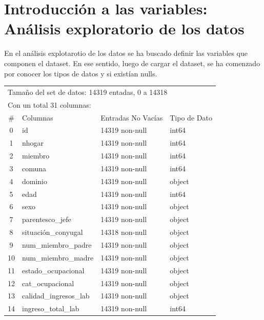 \documentclass[a4paper]{article}
\begin{document}
\newpage

\section{Introducción a las variables: Análisis exploratorio de los datos}
 
    En el análisis explotarotio de los datos se ha buscado definir las variables que componen el dataset. En ese sentido, luego de cargar el dataset, se ha comenzado por conocer los tipos de datos y si existían nulls.
   
    \begin{table}[H]\begin{center}
    \begin{tabular}{clll}
    \multicolumn{4}{l}{Tamaño del set de datos: 14319 entadas, 0 a 14318} \\
    \multicolumn{4}{l}{Con un total 31 columnas:}  \\
    \#  & Columnas                   & Entradas No Vacías & Tipo de Dato \\ \hline
    0  & id                          & 14319 non-null & int64 \\
    1  & nhogar                      & 14319 non-null & int64 \\
    2  & miembro                     & 14319 non-null & int64 \\
    3  & comuna                      & 14319 non-null & int64 \\
    4  & dominio                     & 14319 non-null & object \\
    5  & edad                        & 14319 non-null & int64 \\
    6  & sexo                        & 14319 non-null & object \\
    7  & parentesco\_jefe             & 14319 non-null & object \\
    8  & situación\_conyugal          & 14318 non-null & object \\
    9  & num\_miembro\_padre           & 14319 non-null & object \\
    10 & num\_miembro\_madre           & 14319 non-null & object \\
    11 & estado\_ocupacional          & 14319 non-null & object \\
    12 & cat\_ocupacional             & 14319 non-null & object \\
    13 & calidad\_ingresos\_lab        & 14319 non-null & object \\
    14 & ingreso\_total\_lab           & 14319 non-null & int64  \\

\end{tabular}
\end{center}
\end{table}
\end{document}

